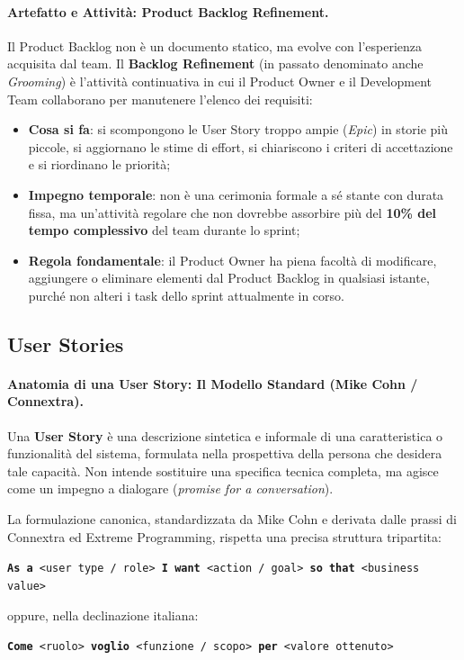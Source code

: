 \documentclass[12pt]{extarticle}
\begin{document}
\paragraph{Artefatto e Attività: Product Backlog Refinement.}
Il Product Backlog non è un documento statico, ma evolve con l'esperienza acquisita dal team. Il \textbf{Backlog Refinement} (in passato denominato anche \textit{Grooming}) è l'attività continuativa in cui il Product Owner e il Development Team collaborano per manutenere l'elenco dei requisiti:
\begin{itemize}
    \item \textbf{Cosa si fa}: si scompongono le User Story troppo ampie (\textit{Epic}) in storie più piccole, si aggiornano le stime di effort, si chiariscono i criteri di accettazione e si riordinano le priorità;
    \item \textbf{Impegno temporale}: non è una cerimonia formale a sé stante con durata fissa, ma un'attività regolare che non dovrebbe assorbire più del \textbf{10\% del tempo complessivo} del team durante lo sprint;
    \item \textbf{Regola fondamentale}: il Product Owner ha piena facoltà di modificare, aggiungere o eliminare elementi dal Product Backlog in qualsiasi istante, purché non alteri i task dello sprint attualmente in corso.
\end{itemize}

\subsection{User Stories}

\paragraph{Anatomia di una User Story: Il Modello Standard (Mike Cohn / Connextra).}
Una \textbf{User Story} è una descrizione sintetica e informale di una caratteristica o funzionalità del sistema, formulata nella prospettiva della persona che desidera tale capacità. Non intende sostituire una specifica tecnica completa, ma agisce come un impegno a dialogare (\textit{promise for a conversation}).

\noindent La formulazione canonica, standardizzata da Mike Cohn e derivata dalle prassi di Connextra ed Extreme Programming, rispetta una precisa struttura tripartita:
\begin{center}
\large
\texttt{\textbf{As a} <user type / role> \quad \textbf{I want} <action / goal> \quad \textbf{so that} <business value>}
\end{center}
oppure, nella declinazione italiana:
\begin{center}
\large
\texttt{\textbf{Come} <ruolo> \quad \textbf{voglio} <funzione / scopo> \quad \textbf{per} <valore ottenuto>}
\end{center}
\end{document}
